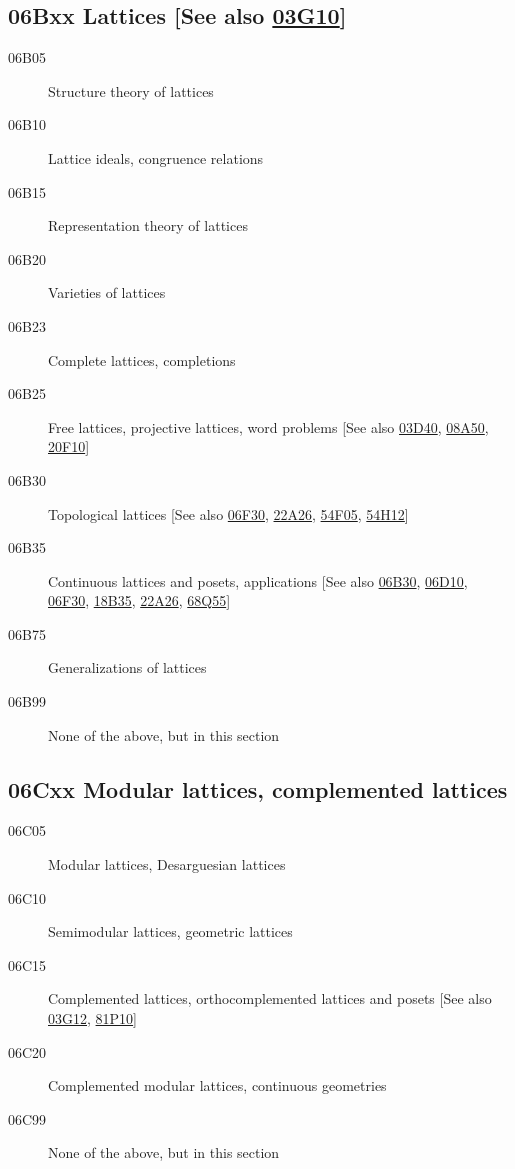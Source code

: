 \subsection*{06Bxx  Lattices [See also \hyperref[03G10]{03G10}] }\label{06Bxx}
\begin{description}  
\item [06B05]\label{06B05} Structure theory of lattices
\item [06B10]\label{06B10} Lattice ideals, congruence relations
\item [06B15]\label{06B15} Representation theory of lattices
\item [06B20]\label{06B20} Varieties of lattices
\item [06B23]\label{06B23} Complete lattices, completions
\item [06B25]\label{06B25} Free lattices, projective lattices, word problems [See also \hyperref[03D40]{03D40}, \hyperref[08A50]{08A50}, \hyperref[20F10]{20F10}]
\item [06B30]\label{06B30} Topological lattices [See also \hyperref[06F30]{06F30}, \hyperref[22A26]{22A26}, \hyperref[54F05]{54F05}, \hyperref[54H12]{54H12}]
\item [06B35]\label{06B35} Continuous lattices and posets, applications [See also \hyperref[06B30]{06B30}, \hyperref[06D10]{06D10}, \hyperref[06F30]{06F30}, \hyperref[18B35]{18B35}, \hyperref[22A26]{22A26}, \hyperref[68Q55]{68Q55}]
\item [06B75]\label{06B75} Generalizations of lattices
\item [06B99]\label{06B99} None of the above, but in this section
\end{description}
\subsection*{06Cxx  Modular lattices, complemented lattices }\label{06Cxx}
\begin{description}  
\item [06C05]\label{06C05} Modular lattices, Desarguesian lattices
\item [06C10]\label{06C10} Semimodular lattices, geometric lattices
\item [06C15]\label{06C15} Complemented lattices, orthocomplemented lattices and posets [See also \hyperref[03G12]{03G12}, \hyperref[81P10]{81P10}]
\item [06C20]\label{06C20} Complemented modular lattices, continuous geometries
\item [06C99]\label{06C99} None of the above, but in this section
\end{description}
